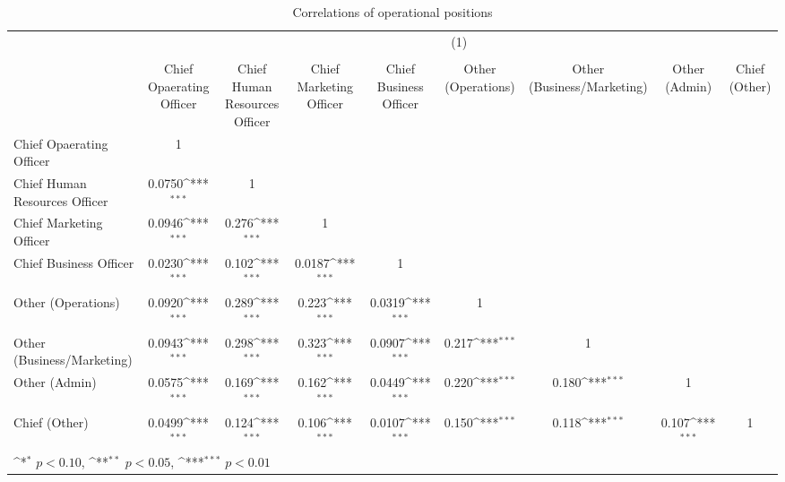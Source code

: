 \begin{table}[htbp]\centering
\def\sym#1{\ifmmode^{#1}\else\(^{#1}\)\fi}
\caption{Correlations of operational positions}
\begin{tabular}{l*{8}{c}}
\toprule
                &\multicolumn{8}{c}{(1)}                                                                                                                                \\
                &\multicolumn{8}{c}{}                                                                                                                                   \\
                &Chief Opaerating Officer         &Chief Human Resources Officer         &Chief Marketing Officer         &Chief Business Officer         &Other (Operations)         &Other (Business/Marketing)         &Other (Admin)         &Chief (Other)         \\
\midrule
Chief Opaerating Officer&        1         &                  &                  &                  &                  &                  &                  &                  \\
Chief Human Resources Officer&   0.0750\sym{***}&        1         &                  &                  &                  &                  &                  &                  \\
Chief Marketing Officer&   0.0946\sym{***}&    0.276\sym{***}&        1         &                  &                  &                  &                  &                  \\
Chief Business Officer&   0.0230\sym{***}&    0.102\sym{***}&   0.0187\sym{***}&        1         &                  &                  &                  &                  \\
Other (Operations)&   0.0920\sym{***}&    0.289\sym{***}&    0.223\sym{***}&   0.0319\sym{***}&        1         &                  &                  &                  \\
Other (Business/Marketing)&   0.0943\sym{***}&    0.298\sym{***}&    0.323\sym{***}&   0.0907\sym{***}&    0.217\sym{***}&        1         &                  &                  \\
Other (Admin)   &   0.0575\sym{***}&    0.169\sym{***}&    0.162\sym{***}&   0.0449\sym{***}&    0.220\sym{***}&    0.180\sym{***}&        1         &                  \\
Chief (Other)   &   0.0499\sym{***}&    0.124\sym{***}&    0.106\sym{***}&   0.0107\sym{***}&    0.150\sym{***}&    0.118\sym{***}&    0.107\sym{***}&        1         \\
\bottomrule
\multicolumn{9}{l}{\footnotesize \sym{*} \(p<0.10\), \sym{**} \(p<0.05\), \sym{***} \(p<0.01\)}\\
\end{tabular}
\end{table}
